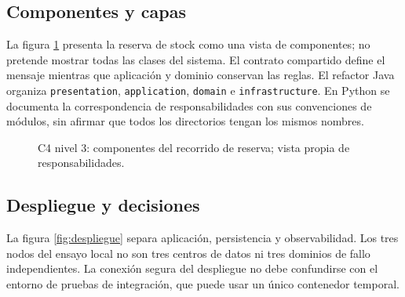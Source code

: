 \documentclass[12pt,a4paper]{article}
\begin{document}
\subsection{Componentes y capas}
La figura \ref{fig:componentes} presenta la reserva de stock como una vista de componentes; no pretende mostrar todas las clases del sistema. El contrato compartido define el mensaje mientras que aplicación y dominio conservan las reglas. El refactor Java organiza \texttt{presentation}, \texttt{application}, \texttt{domain} e \texttt{infrastructure}. En Python se documenta la correspondencia de responsabilidades con sus convenciones de módulos, sin afirmar que todos los directorios tengan los mismos nombres.

\begin{figure}[H]\centering
{}
\caption{C4 nivel 3: componentes del recorrido de reserva; vista propia de responsabilidades.}\label{fig:componentes}
\end{figure}

\subsection{Despliegue y decisiones}
La figura \ref{fig:despliegue} separa aplicación, persistencia y observabilidad. Los tres nodos del ensayo local no son tres centros de datos ni tres dominios de fallo independientes. La conexión segura del despliegue no debe confundirse con el entorno de pruebas de integración, que puede usar un único contenedor temporal.
\end{document}
